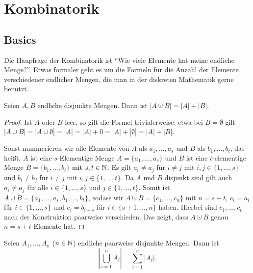 \chapter{Kombinatorik} 

\section{Basics} 

\begin{bem}
	Die Haupfrage der Kombinatorik ist ``Wie viele Elemente hat meine endliche Menge?''. Etwas formaler geht es um die Formeln für die Anzahl der Elemente verschiedener endlicher Mengen, die man in der diskreten Mathematik gerne benutzt. 
\end{bem} 

\begin{lem} \label{lem:vereinigung:zwei}
	Seien $A, B$ endliche disjunkte Mengen. Dann ist $|A \cupdot B| = |A| + |B|$. 
\end{lem} 

\begin{proof}
	Ist $A$ oder $B$ leer, so gilt die Formel trivialerweise: etwa bei $B = \emptyset$ gilt $|A \cup B| = | A \cup \emptyset| = |A| = |A| + 0 = |A| + | \emptyset| = |A| + |B|$. 
	
	 Sonst nummerieren wir alle Elemente von $A$ als $a_1,\ldots,a_s$ und $B$ als $b_1,\ldots,b_t$, das heißt, $A$ ist eine $s$-Elementige Menge $A = \{a_1,\ldots,a_s\}$ und $B$ ist eine $t$-elementige Menge $B = \{b_1,\ldots,b_t\}$ mit $s,t \in \mathbb{N}$. Es gilt $a_i \ne a_j$ für $i \ne j$ mit $i,j \in \{1,\ldots,s\}$ und $b_i \ne b_j$ für $i \ne j$ mit $i,j \in \{1,\ldots,t\}$. Da $A$ und $B$ disjunkt sind gilt auch $a_i \ne a_j$ für alle $i \in \{1,\ldots,s\}$ und $j \in \{1,\ldots,t\}$. Somit ist 
	 $A \cupdot B = \{a_1,\ldots,a_s,b_1,\ldots,b_t\}$, sodass wir $A \cupdot B = \{c_1,\ldots,c_n\}$ mit $n = s + t$, $c_i = a_i$ für $i \in\{1,\ldots,s\}$ und $c_i = b_{i-s}$ für $i \in \{s+1,\ldots,n\}$ haben. Hierbei sind $c_1,\ldots,c_n$ nach der Konstruktion paarweise verschieden. Das zeigt, dass $A \cupdot B$ genau $n = s+t$ Elemente hat. 
\end{proof}

\begin{lem} \label{lem:disjunkte:vereinigung}
	Seien $A_1,\ldots,A_n$ ($n \in \mathbb{N}$) endliche paarweise disjunkte Mengen. Dann ist 
	\[
		\left| \bigcup_{i=1}^n A_i \right| = \sum_{i=1}^n |A_i|. 
	\]
\end{lem} 

